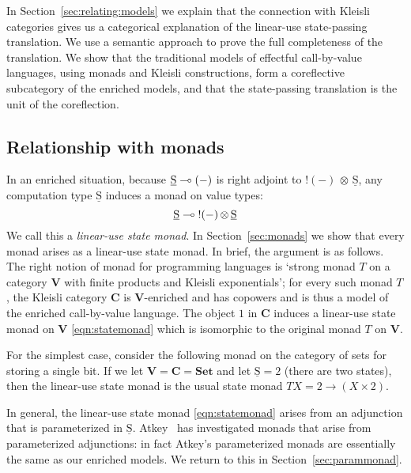 \documentclass{LMCS}
\newcommand{\hide}[1]{}
\newcommand{\tensor}{\otimes}
\newcommand{\ltensortype}[2]{{!} #1 \, {\tensor} \, #2}
\newcommand{\VCat}{\fixedcatfont{V}} \newcommand{\CCat}{\fixedcatfont{C}} \newcommand{\DCat}{\fixedcatfont{D}}
\newcommand{\fixedcatfont}{\mathbf}
\newcommand{\Set}{\mathbf{Set}}
\newcommand{\states}{{\underline{\mathrm{S}}}}
\begin{document}
In Section~\ref{sec:relating:models} we explain that
the connection with Kleisli categories gives us a categorical 
explanation of the linear-use state-passing translation.
We use a semantic 
approach to prove the full completeness 
of the translation.
We show that the
traditional models of effectful call-by-value languages, using monads
and Kleisli constructions, form a coreflective subcategory 
of the enriched models, and that the state-passing translation is the
unit of the coreflection.  
\hide{Our main semantic result provides a
bijective correspondence between comodel structures on a state object
and model structures on the induced linear state monad. This extends
Plotkin and Power's correspondence between algebraic operations and
generic effects~\cite{Plotkin:Power:03} with a third component: state access operations.}

\subsection{Relationship with monads}
\label{sec:intro:monads}


In an enriched situation, because $\states\lpop{(-)}$ is right adjoint to 
$\ltensortype {(-)}\states$,
any computation type $\states$ induces a monad on value types:
\begin{equation}
\label{eqn:statemonad}
\states\lpop \ltensortype {(-)}\states
\end{equation}
We call this a \emph{linear-use state monad}.
In Section~\ref{sec:monads} we show that 
every monad arises as a linear-use state monad. 
In brief, the argument is as follows.
The right notion of monad for programming languages is
`strong monad $T$ on a category $\VCat$ with finite products and 
Kleisli exponentials';
for every such monad $T$,
the Kleisli category $\CCat$ is $\VCat$-enriched and has copowers
and is thus a model of the enriched call-by-value language.
The object $1$ in $\CCat$ 
induces a linear-use state monad
on $\VCat$  \eqref{eqn:statemonad} 
which is isomorphic to
the original monad $T$ on $\VCat$.

For the simplest case, consider the following monad on the category
of sets for storing a single bit. 
If we let $\VCat=\CCat=\Set$ and 
let $\states=2$ (there are two states), 
then the linear-use state monad is the usual state monad
$TX = 2 \to (X \times 2)$.

In general, the linear-use state monad \eqref{eqn:statemonad} arises
from an adjunction that is parameterized in $\states$.
Atkey~\cite{a-parammonad} has investigated monads that arise from
parameterized adjunctions: in fact Atkey's parameterized monads are
essentially the same as our enriched models.  We return to this in
Section~\ref{sec:parammonad}.
\end{document}
